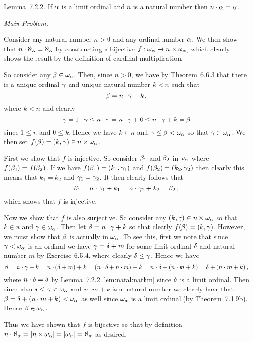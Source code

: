 \def\ex{7.2.2}
\setcounter{itm}{0}
\question{\ex}
\begin{solution}
    \begin{statement}{Lemma~\ex.}
        If $\alpha$ is a limit ordinal and $n$ is a natural number then $n \cdot \alpha = \alpha$.
    \end{statement}

    \emph{Main Problem.}

    Consider any natural number $n > 0$ and any ordinal number $\alpha$.
    We then show that $n \cdot \aleph_\alpha = \aleph_\alpha$ by constructing a bijective $f: \omega_\alpha \to n \times \omega_\alpha$, which clearly shows the result by the definition of cardinal multiplication.

    So consider any $\beta \in \omega_\alpha$.
    Then, since $n > 0$, we have by Theorem~6.6.3 that there is a unique ordinal $\gamma$ and unique natural number $k < n$ such that
    $$
    \beta = n \cdot \gamma + k \,,
    $$
    where $k < n$ and clearly
    $$
    \gamma = 1 \cdot \gamma \leq n \cdot \gamma = n \cdot \gamma + 0 \leq n \cdot \gamma + k = \beta
    $$
    since $1 \leq n$ and $0 \leq k$.
    Hence we have $k \in n$ and $\gamma \leq \beta < \omega_\alpha$ so that $\gamma \in \omega_\alpha$.
    We then set $f(\beta) = (k, \gamma) \in n \times \omega_\alpha$.

    First we show that $f$ is injective.
    So consider $\beta_1$ and $\beta_2$ in $\omega_\alpha$ where $f(\beta_1) = f(\beta_2)$.
    If we have $f(\beta_1) = (k_1, \gamma_1)$ and $f(\beta_2) = (k_2, \gamma_2)$ then clearly this means that $k_1 = k_2$ and $\gamma_1 = \gamma_2$.
    It then clearly follows that
    $$
    \beta_1 = n \cdot \gamma_1 + k_1 = n \cdot \gamma_2 + k_2 = \beta_2 \,,
    $$
    which shows that $f$ is injective.

    Now we show that $f$ is also surjective.
    So consider any $(k, \gamma) \in n \times \omega_\alpha$ so that $k \in n$ and $\gamma \in \omega_\alpha$.
    Then let $\beta = n \cdot \gamma + k$ so that clearly $f(\beta) = (k, \gamma)$.
    However, we must show that $\beta$ is actually in $\omega_\alpha$.
    To see this, first we note that since $\gamma < \omega_\alpha$ is an ordinal we have $\gamma = \delta + m$ for some limit ordinal $\delta$ and natural number $m$ by Exercise~6.5.4, where clearly $\delta \leq \gamma$.
    Hence we have
    $$
    \beta = n \cdot \gamma + k = n \cdot (\delta + m) + k = (n \cdot \delta + n \cdot m) + k = n \cdot \delta + (n \cdot m + k) = \delta + (n \cdot m + k) \,,
    $$
    where $n \cdot \delta = \delta$ by Lemma~\ex.\ref{lem:natal:natlim} since $\delta$ is a limit ordinal.
    Then since also $\delta \leq \gamma < \omega_\alpha$ and $n \cdot m + k$ is a natural number we clearly have that $\beta = \delta + (n \cdot m + k)< \omega_\alpha$ as well since $\omega_\alpha$ is a limit ordinal (by Theorem~7.1.9b).
    Hence $\beta \in \omega_\alpha$.

    Thus we have shown that $f$ is bijective so that by definition $n \cdot \aleph_\alpha = \left| n \times \omega_\alpha \right| = \left| \omega_\alpha \right| = \aleph_\alpha$ as desired. \qedsymbol
\end{solution}


